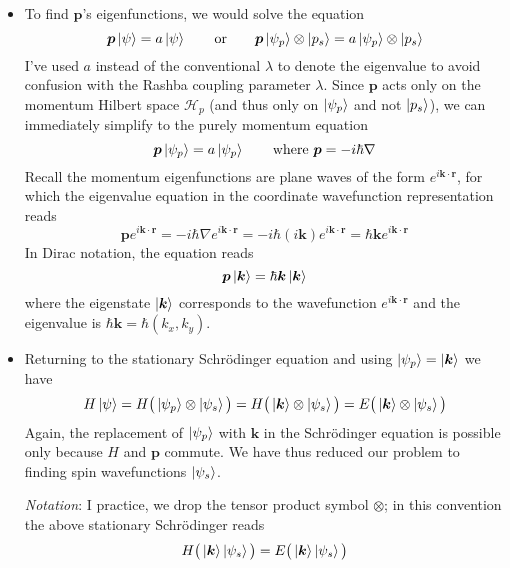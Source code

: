 \documentclass[11pt, a4paper]{article}
\newcommand{\eqtext}[1]{\qquad \text{#1} \qquad}
\newcommand{\Schro}{Schr\"{o}dinger\xspace}
\renewcommand{\vec}[1]{\bm{#1}} %
\newcommand{\p}{\psi}  %
\renewcommand{\H}{\mathcal{H}}  %
\renewcommand{\k}{\vec{k}}  %
\begin{document}
\begin{itemize}
	\item To find $ \vec{p} $'s eigenfunctions, we would solve the equation
	\begin{equation*}
		\vec{p} \ket{\p} = a \ket{\p} \eqtext{or} \vec{p}\ket{\p_{p}}\otimes\ket{p_{s}} = a \ket{\p_{p}}\otimes\ket{p_{s}}
	\end{equation*}
	I've used $ a $ instead of the conventional $ \lambda $ to denote the eigenvalue to avoid confusion with the Rashba coupling parameter $ \lambda $. Since $ \vec{p} $ acts only on the momentum Hilbert space $ \H_{p} $ (and thus only on $ \ket{\p_{p}} $ and not $ \ket{p_{s}} $), we can immediately simplify to the purely momentum equation
	\begin{equation*}
		\vec{p}\ket{\psi_{p}} = a \ket{\psi_{p}} \qquad \text{where } \vec{p} = -i\hbar \nabla
	\end{equation*}
	Recall the momentum eigenfunctions are plane waves of the form $ e^{i\vec{k}\cdot \vec{r}} $, for which the eigenvalue equation in the coordinate wavefunction representation reads
	\begin{equation*}
		\vec{p} e^{i\vec{k}\cdot \vec{r}} =  -i\hbar \nabla e^{i\vec{k}\cdot \vec{r}}  = -i\hbar (i \vec{k}) e^{i\vec{k}\cdot \vec{r}} = \hbar \vec{k}e^{i\vec{k}\cdot \vec{r}}
	\end{equation*}
	In Dirac notation, the equation reads
	\begin{equation*}
		\vec{p}\ket{\vec{k}} = \hbar \vec{k} \ket{\vec{k}} 
	\end{equation*}
	where the eigenstate $ \ket{\k} $ corresponds to the wavefunction $ e^{i\vec{k}\cdot \vec{r}} $ and the eigenvalue is $ \hbar \vec{k} = \hbar(k_{x}, k_{y}) $.
	
	\item Returning to the stationary \Schro equation and using $ \ket{\psi_{p}} = \ket{\k} $ we have
	\begin{equation*}
		H\ket{\psi} = H\big(\ket{\psi_{p}} \otimes \ket{\psi_{s}}\big) = H\big(\ket{\k} \otimes \ket{\psi_{s}}\big) = E \big(\ket{\k}\otimes \ket{\psi_{s}}\big)
	\end{equation*}
	Again, the replacement of $ \ket{\psi_{p}}$ with $ \k $ in the \Schro equation is possible only because $ H $ and $ \vec{p} $ commute. We have thus reduced our problem to finding spin wavefunctions $ \ket{\psi_{s}} $. 
	
	\textit{Notation}: I practice, we drop the tensor product symbol $ \otimes $; in this convention the above stationary \Schro reads
	\begin{equation*}
		H\big(\ket{\k} \ket{\psi_{s}}\big) = E \big(\ket{\k} \ket{\psi_{s}}\big)
	\end{equation*}
	

\end{itemize}
\end{document}
